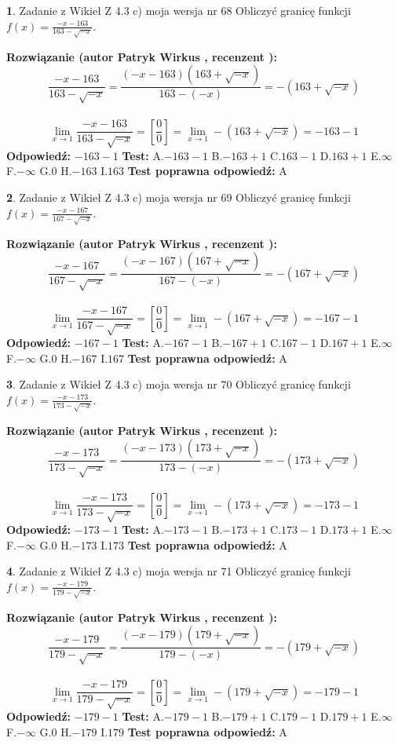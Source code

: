 \documentclass[12pt, a4paper]{article}
\theoremstyle{definition} %
\newtheorem{zad}{}
\newcommand{\zadStart}[1]{\begin{zad}#1\newline}
\newcommand{\zadStop}{\end{zad}}
\newcommand{\rozwStart}[2]{\noindent \textbf{Rozwiązanie (autor #1 , recenzent #2): }\newline}
\newcommand{\rozwStop}{\newline}
\newcommand{\odpStart}{\noindent \textbf{Odpowiedź:}\newline}
\newcommand{\odpStop}{\newline}
\newcommand{\testStart}{\noindent \textbf{Test:}\newline}
\newcommand{\testStop}{\newline}
\newcommand{\kluczStart}{\noindent \textbf{Test poprawna odpowiedź:}\newline}
\newcommand{\kluczStop}{\newline}
\begin{document}
\zadStart{Zadanie z Wikieł Z 4.3 c) moja wersja nr 68}
Obliczyć granicę funkcji $f(x)=\frac{-x-163}{163-\sqrt{-x}}$.
\zadStop
\rozwStart{Patryk Wirkus}{}
$$\frac{-x-163}{163-\sqrt{-x}}=\frac{(-x-163)(163+\sqrt{-x})}{163-(-x)}=-(163+\sqrt{-x})$$
\\
$$\lim\limits_{x\to1}\frac{-x-163}{163-\sqrt{-x}}=[\frac{0}{0}]=\lim\limits_{x\to1}-(163+\sqrt{-x}) =-163-1$$
\rozwStop
\odpStart
$-163-1$
\odpStop
\testStart
A.$-163-1$
B.$-163+1$
C.$163-1$
D.$163+1$
E.$\infty$
F.$-\infty$
G.$0$
H.$-163$
I.$163$
\testStop
\kluczStart
A
\kluczStop



\zadStart{Zadanie z Wikieł Z 4.3 c) moja wersja nr 69}
Obliczyć granicę funkcji $f(x)=\frac{-x-167}{167-\sqrt{-x}}$.
\zadStop
\rozwStart{Patryk Wirkus}{}
$$\frac{-x-167}{167-\sqrt{-x}}=\frac{(-x-167)(167+\sqrt{-x})}{167-(-x)}=-(167+\sqrt{-x})$$
\\
$$\lim\limits_{x\to1}\frac{-x-167}{167-\sqrt{-x}}=[\frac{0}{0}]=\lim\limits_{x\to1}-(167+\sqrt{-x}) =-167-1$$
\rozwStop
\odpStart
$-167-1$
\odpStop
\testStart
A.$-167-1$
B.$-167+1$
C.$167-1$
D.$167+1$
E.$\infty$
F.$-\infty$
G.$0$
H.$-167$
I.$167$
\testStop
\kluczStart
A
\kluczStop



\zadStart{Zadanie z Wikieł Z 4.3 c) moja wersja nr 70}
Obliczyć granicę funkcji $f(x)=\frac{-x-173}{173-\sqrt{-x}}$.
\zadStop
\rozwStart{Patryk Wirkus}{}
$$\frac{-x-173}{173-\sqrt{-x}}=\frac{(-x-173)(173+\sqrt{-x})}{173-(-x)}=-(173+\sqrt{-x})$$
\\
$$\lim\limits_{x\to1}\frac{-x-173}{173-\sqrt{-x}}=[\frac{0}{0}]=\lim\limits_{x\to1}-(173+\sqrt{-x}) =-173-1$$
\rozwStop
\odpStart
$-173-1$
\odpStop
\testStart
A.$-173-1$
B.$-173+1$
C.$173-1$
D.$173+1$
E.$\infty$
F.$-\infty$
G.$0$
H.$-173$
I.$173$
\testStop
\kluczStart
A
\kluczStop



\zadStart{Zadanie z Wikieł Z 4.3 c) moja wersja nr 71}
Obliczyć granicę funkcji $f(x)=\frac{-x-179}{179-\sqrt{-x}}$.
\zadStop
\rozwStart{Patryk Wirkus}{}
$$\frac{-x-179}{179-\sqrt{-x}}=\frac{(-x-179)(179+\sqrt{-x})}{179-(-x)}=-(179+\sqrt{-x})$$
\\
$$\lim\limits_{x\to1}\frac{-x-179}{179-\sqrt{-x}}=[\frac{0}{0}]=\lim\limits_{x\to1}-(179+\sqrt{-x}) =-179-1$$
\rozwStop
\odpStart
$-179-1$
\odpStop
\testStart
A.$-179-1$
B.$-179+1$
C.$179-1$
D.$179+1$
E.$\infty$
F.$-\infty$
G.$0$
H.$-179$
I.$179$
\testStop
\kluczStart
A
\kluczStop
\end{document}
